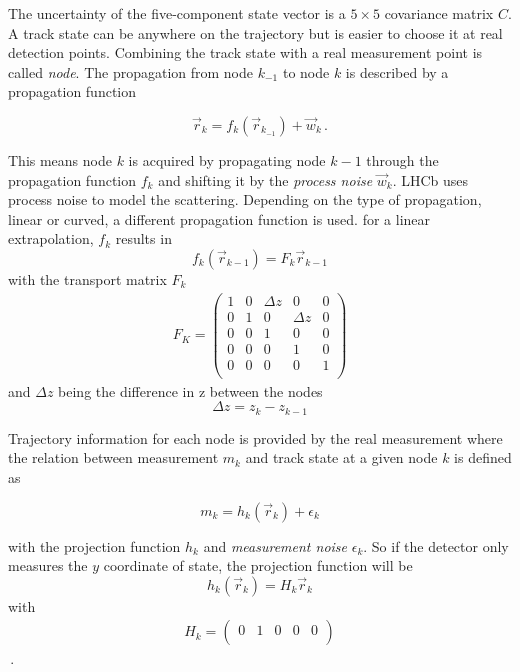 The uncertainty of the five-component state vector is a $5\times5$ covariance matrix $C$.
A track state can be anywhere on the trajectory but is easier to choose it at real detection points. Combining the track state with a real measurement point is called \textit{node}.
The propagation from node $k_{-1}$ to node $k$ is described by a propagation function

\begin{equation*}
  \vec{r}_k = f_k(\vec{r}_{k_{-1}}) + \vec{w}_k\,.
\end{equation*}

This means node $k$ is acquired by propagating node $k-1$ through the propagation function $f_k$ and shifting it by the \textit{process noise} $\vec{w}_k$.
LHCb uses process noise to model the scattering.
Depending on the type of propagation, linear or curved, a different propagation function is used.
for a linear extrapolation, $f_k$ results in
\begin{equation*}
  f_k \left(\vec{r}_{k-1}\right) = F_k \vec{r}_{k-1}
\end{equation*}
with the transport matrix $F_k$
\begin{gather*}
  F_K = \begin{pmatrix}
    1 & 0 & \Delta z & 0 & 0 \\
    0 & 1 & 0 & \Delta z & 0 \\
    0 & 0 & 1 & 0 & 0 \\
    0 & 0 & 0 & 1 & 0 \\
    0 & 0 & 0 & 0 & 1 \\
  \end{pmatrix}
\end{gather*}
and $\Delta z$ being the difference in z between the nodes
\begin{equation*}
  \Delta z = z_k - z_{k-1}
\end{equation*}


Trajectory information for each node is provided by the real measurement where the relation between measurement $m_k$ and track state at a given node $k$ is defined as

\begin{equation*}
  m_k = h_k(\vec{r}_k) + \epsilon_k
\end{equation*}

with the projection function $h_k$ and \textit{measurement noise} $\epsilon_k$.
So if the detector only measures the $y$ coordinate of state, the projection function
will be
\begin{equation*}
  h_k(\vec{r}_k) = H_k \vec{r}_k
\end{equation*}
with
\begin{gather*}
  H_k = \begin{pmatrix}
    0 & 1 & 0 & 0 & 0 \\
  \end{pmatrix}
\end{gather*}\,.

